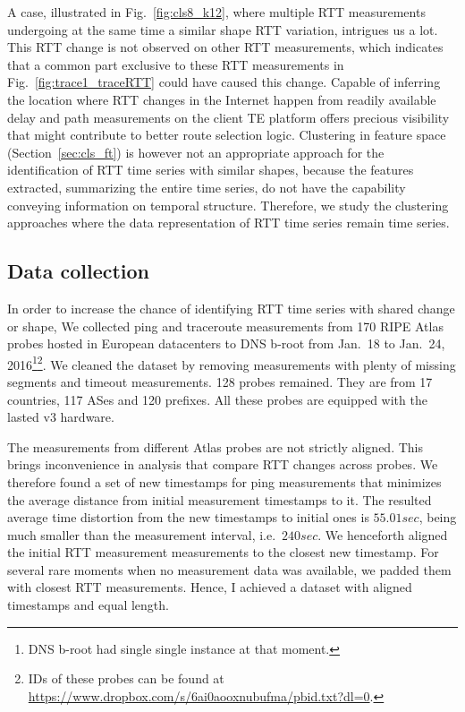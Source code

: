 A case, illustrated in Fig.~\ref{fig:cls8_k12}, where multiple RTT measurements undergoing at the same time a similar shape RTT variation, intrigues us a lot. This RTT change is not observed on other RTT measurements, which indicates that a common part exclusive to these RTT measurements in Fig.~\ref{fig:trace1_traceRTT} could have caused this change.
Capable of inferring the location where RTT changes in the Internet happen from readily available delay and path measurements on the client TE platform offers precious visibility that might contribute to better route selection logic.
Clustering in feature space (Section~\ref{sec:cls_ft}) is however not an appropriate approach for the identification of RTT time series with similar shapes, because the features extracted, summarizing the entire time series, do not have the capability conveying information on temporal structure.
Therefore, we study the clustering approaches where the data representation of RTT time series remain time series.

\subsection{Data collection}
In order to increase the chance of identifying RTT time series with shared change or shape, We collected ping and traceroute measurements from 170 RIPE Atlas probes hosted in European datacenters to DNS b-root from Jan.\ 18 to Jan.\ 24, 2016\footnote{DNS b-root had single single instance at that moment.}\footnote{IDs of these probes can be found at \url{https://www.dropbox.com/s/6ai0aooxnubufma/pbid.txt?dl=0}.}.
We cleaned the dataset by removing measurements with plenty of missing segments and timeout measurements.
128 probes remained. They are from 17 countries, 117 ASes and 120 prefixes. All these probes are equipped with the lasted v3 hardware.

The measurements from different Atlas probes are not strictly aligned.
This brings inconvenience in analysis that compare RTT changes across probes. 
We therefore found a set of new timestamps for ping measurements that minimizes the average distance from initial measurement timestamps to it.
The resulted average time distortion from the new timestamps to initial ones is $55.01 sec$, being much smaller than the measurement interval, i.e.\ $240s ec$.
We henceforth aligned the initial RTT measurement measurements to the closest new timestamp.
For several rare moments when no measurement data was available, we padded them with closest RTT measurements.
Hence, I achieved a dataset with aligned timestamps and equal length.

